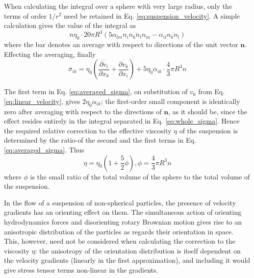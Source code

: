 \documentclass[conference]{IEEEtran}
\theoremstyle{definition}
\theoremstyle{remark}
\begin{document}
    When calculating the integral over a sphere with very large radius, only the terms of order $1/r^2$ need be retained in Eq. \ref{eq:suspension_velocity}. A simple calculation gives the value of the integral as
    \begin{equation*}
        n \eta_0 \cdot 20 \pi R^3 (5 \alpha_{lm} \overline{n_i n_k n_l n_m} - \alpha_{il} \overline{n_k n_l})
    \end{equation*}
    where the bar denotes an average with respect to directions of the unit vector $\mathbf{n}$. Effecting the averaging, finally
    \begin{equation}
        \overline{\sigma}_{ik} = \eta_0 \left( \dfrac{\overline{\partial v_i}}{\partial x_k} + \dfrac{\overline{\partial v_k}}{\partial x_i} \right) + 5 \eta_0 \alpha_{ik} \cdot \dfrac43 \pi R^3 n
        \label{eq:averaged_sigma}
    \end{equation}

    The first term in Eq. \ref{eq:averaged_sigma}, on substitution of $v_0$ from Eq. \ref{eq:linear_velocity}, gives $2 \eta_0 \alpha_{ik}$; the first-order small component is identically zero after averaging with respect to the directions of $\mathbf{n}$, as it should be, since the effect resides entirely in the integral separated in Eq. \ref{eq:whole_sigma}. Hence the required relative correction to the effective viscosity $\eta$ of the suspension is determined by the ratio-of the second and the first terms in Eq. \ref{eq:averaged_sigma}. Thus
    \begin{equation}
        \eta = \eta_0 (1 + \dfrac52 \phi), \phi = \dfrac43 \pi R^3 n
    \end{equation}
    where $\phi$ is the small ratio of the total volume of the sphere to the total volume of the suspension.

    In the flow of a suspension of non-spherical particles, the presence of velocity gradients has an orienting effect on them. The simultaneous action of orienting hydrodynamics forces and disorienting rotary Brownian motion gives rise to an anisotropic distribution of the particles as regards their orientation in space. This, however, need not be considered when calculating the correction to the viscosity $\eta$: the anisotropy of the orientation distribution is itself dependent on the velocity gradients (linearly in the first approximation), and including it would give stress tensor terms non-linear in the gradients.
\end{document}
